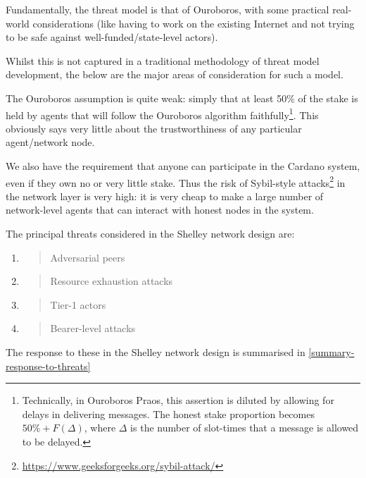 \documentclass[11pt,a4paper]{article}
\begin{document}
Fundamentally, the threat model is that of Ouroboros, with some
practical real-world considerations (like having to work on the existing
Internet and not trying to be safe against well-funded/state-level
actors).

Whilst this is not captured in a traditional methodology of threat model
development, the below are the major areas of consideration for such a
model.

The Ouroboros assumption is quite weak: simply that at least 50\% of the
stake is held by agents that will follow the Ouroboros algorithm
faithfully\footnote{Technically, in Ouroboros Praos, this assertion is
  diluted by allowing for delays in delivering messages. The honest
  stake proportion becomes $50\% + F(\Delta)$, where $\Delta$ is the number of
  slot-times that a message is allowed to be delayed.}. This obviously
says very little about the trustworthiness of any particular
agent/network node.

We also have the requirement that anyone can participate in the Cardano
system, even if they own no or very little stake. Thus the risk of
Sybil-style attacks\footnote{\href{https://www.geeksforgeeks.org/sybil-attack/}{{https://www.geeksforgeeks.org/sybil-attack/}}}
in the network layer is very high: it is very cheap to make a large
number of network-level agents that can interact with honest nodes in
the system.

The principal threats considered in the Shelley network design are:

\begin{enumerate}
\def\labelenumi{\arabic{enumi}.}
\item
  \begin{quote}
  Adversarial peers
  \end{quote}
\item
  \begin{quote}
  Resource exhaustion attacks
  \end{quote}
\item
  \begin{quote}
  Tier-1 actors
  \end{quote}
\item
  \begin{quote}
  Bearer-level attacks
  \end{quote}
\end{enumerate}

The response to these in the Shelley network design is summarised in
\cref{summary-response-to-threats}
\end{document}
